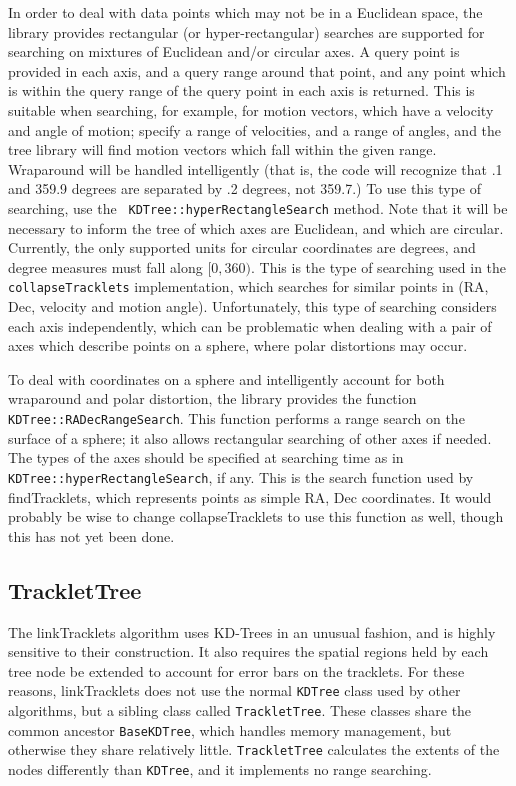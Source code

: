 In order to deal with data points which may not be in a Euclidean
space, the library provides rectangular (or hyper-rectangular)
searches are supported for searching on mixtures of Euclidean and/or
circular axes.  A query point is provided in each axis, and a query
range around that point, and any point which is within the query range
of the query point in each axis is returned.  This is suitable when
searching, for example, for motion vectors, which have a velocity and
angle of motion; specify a range of velocities, and a range of angles,
and the tree library will find motion vectors which fall within the
given range.  Wraparound will be handled intelligently (that is, the
code will recognize that .1 and 359.9 degrees are separated by .2
degrees, not 359.7.)  To use this type of searching, use the {\tt
KDTree::hyperRectangleSearch} method. Note that it will be necessary
to inform the tree of which axes are Euclidean, and which are
circular.  Currently, the only supported units for circular
coordinates are degrees, and degree measures must fall along $[0,
360)$.  This is the type of searching used in the {\tt
collapseTracklets} implementation, which searches for similar points
in (RA, Dec, velocity and motion angle).  Unfortunately, this type of
searching considers each axis independently, which can be problematic
when dealing with a pair of axes which describe points on a sphere,
where polar distortions may occur.  

To deal with coordinates on a sphere and intelligently account for
both wraparound and polar distortion, the library provides the
function {\tt KDTree::RADecRangeSearch}.  This function performs a
range search on the surface of a sphere; it also allows rectangular
searching of other axes if needed.  The types of the axes should be
specified at searching time as in {\tt KDTree::hyperRectangleSearch},
if any.  This is the search function used by findTracklets, which
represents points as simple RA, Dec coordinates.  It would probably be
wise to change collapseTracklets to use this function as well, though
this has not yet been done.


\subsection{TrackletTree}

The linkTracklets algorithm uses KD-Trees in an unusual fashion, and
is highly sensitive to their construction.  It also requires the
spatial regions held by each tree node be extended to account for
error bars on the tracklets.  For these reasons, linkTracklets does
not use the normal {\tt KDTree} class used by other algorithms, but a
sibling class called {\tt TrackletTree}.  These classes share the
common ancestor {\tt BaseKDTree}, which handles memory management, but
otherwise they share relatively little.  {\tt TrackletTree} calculates
the extents of the nodes differently than {\tt KDTree}, and it
implements no range searching.  

